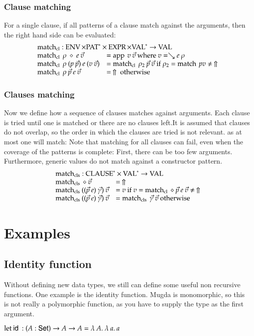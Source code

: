 \subsubsection{Clause matching}
For a single clause, if all patterns of a clause match against the arguments, then the right hand side can be evaluated: 
\[
\begin{array}{ll}
\multicolumn{2}{l}{\matchcl : \Env \times \ves{\Pat} \times \Expr \times \ves{\Val} \ra \Val}\\
\matchcl \: \rho \: \diamond \: e \: \vec{v} & = \ap \: v \: \vec{v} \mbox{ where } v = \wh e \: \rho \\
\matchcl \: \rho \: (p \: \vec{p}) \: e \: (v \: \vec{v}) & = \matchcl \: \rho_2 \: \vec{p} \: \vec{v} \mbox{ if } \rho_2 = \match \: p v \neq \stuck \\  
\matchcl \: \rho \: \vec{p}\: e \: \vec{v} & = \stuck \mbox{ otherwise}\\  
\end{array}
\]

\subsubsection{Clauses matching} 
Now we define how a sequence of clauses matches against arguments. 
Each clause is tried until one is matched or there are no clauses left.It is assumed that clauses do not overlap, so the order in which the clauses are tried is not relevant. as at most one will match:
Note that matching for all clauses can fail, even when the coverage of the patterns is complete: First, there can be too few arguments. Furthermore, generic values do not match against a constructor pattern. 
\[
\begin{array}{ll}
\multicolumn{2}{l}{\matchcls : \ves{\Clause} \times \ves{\Val} \ra \Val}\\
\matchcls \: \diamond \: \vec{v} & = \stuck \\
\matchcls \:  ((\vec{p} \: e)\:\vec{\gamma}) \: \vec{v} & = v \mbox{ if } v = \matchcl \: \diamond \: \vec{p} \: e \:  \vec{v} \neq \stuck \\
\matchcls \: ((\vec{p} \: e)\:\vec{\gamma}) \: \vec{v} & = \matchcls \: \vec{\gamma} \: \vec{v} \mbox{ otherwise}  
\end{array}
\]

\section{Examples}
\subsection{Identity function}
Without defining new data types, we still can define some useful non recursive functions.
One example is the identity function. 
Mugda is monomorphic, so this is not really a polymorphic function, as you have to supply the
type as the first argument.
\begin{bsp}
$\mathrm{let}\: \mathsf{id}\: : ( A : \mathsf{Set} ) \rightarrow{A \rightarrow A} = \lambda\: A .\:\lambda\: a .\:a$   
\end{bsp}

